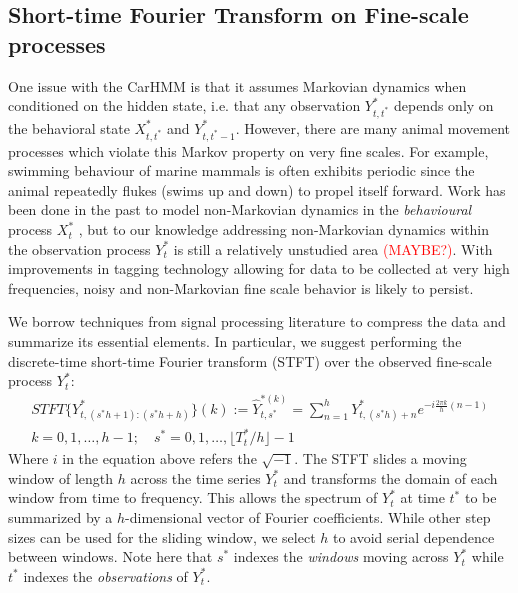 

\subsection{Short-time Fourier Transform on Fine-scale processes}
\label{subsec:STFT}

One issue with the CarHMM is that it assumes Markovian dynamics when conditioned on the hidden state, i.e. that any observation $Y^*_{t,t^*}$ depends only on the behavioral state $X^*_{t,t^*}$ and $Y^*_{t,t^*-1}$. However, there are many animal movement processes which violate this Markov property on very fine scales. For example, swimming behaviour of marine mammals is often exhibits periodic since the animal repeatedly flukes (swims up and down) to propel itself forward. Work has been done in the past to model non-Markovian dynamics in the \textit{behavioural} process $X^*_t$ \cite{Langrock:2012}, but to our knowledge addressing non-Markovian dynamics within the observation process $Y^*_t$ is still a relatively unstudied area \textcolor{red}{(MAYBE?)}. With improvements in tagging technology allowing for data to be collected at very high frequencies, noisy and non-Markovian fine scale behavior is likely to persist.

We borrow techniques from signal processing literature to compress the data and summarize its essential elements. In particular, we suggest performing the discrete-time short-time Fourier transform (STFT) over the observed fine-scale process $Y^*_t$:
%
\begin{align*}
    STFT\{Y^*_{t,(s^*h+1):(s^*h+h) }\}(k) := \hat{Y}^{*(k)}_{t,s^*} = \sum_{n = 1}^{h} Y^*_{t,(s^*h)+n}e^{-i \frac{2\pi k}{h} (n-1)} \\ k = 0, 1, \ldots, h-1; \quad s^* = 0,1, \ldots, \lfloor T^*_t / h \rfloor - 1
\end{align*}
%
Where $i$ in the equation above refers the $\sqrt{-1}$. The STFT slides a moving window of length $h$ across the time series $Y_t^*$ and transforms the domain of each window from time to frequency. This allows the spectrum of $Y_t^*$ at time $t^*$ to be summarized by a $h$-dimensional vector of Fourier coefficients. While other step sizes can be used for the sliding window, we select $h$ to avoid serial dependence between windows. Note here that $s^*$ indexes the \textit{windows} moving across $Y^*_t$ while $t^*$ indexes the \textit{observations} of $Y^*_t$. 

